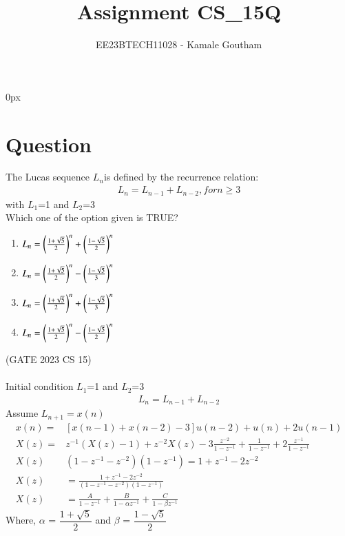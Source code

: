 \documentclass[journal,12pt,twocolumn]{IEEEtran}
\theoremstyle{remark}
\begin{document}
\parindent 0px

\title{Assignment CS\_15Q}
\author{EE23BTECH11028 - Kamale Goutham$^{}$%
}
\maketitle
\newpage
\bigskip
\section*{Question}
The Lucas sequence $L_{n}$is defined by the recurrence relation:\\
\begin{align*}
    L_{n}=L_{n-1}+L_{n-2}, for n\geq3
\end{align*}
with $L_{1}$=1 and $L_{2}$=3\\
Which one of the option given is TRUE?\\
\begin{enumerate}
    \item $L_{n}=\left(\frac{1+\sqrt{5}}{2}\right)^n+\left(\frac{1-\sqrt{5}}{2}\right)^n$
    \item $L_{n}=\left(\frac{1+\sqrt{5}}{2}\right)^n-\left(\frac{1-\sqrt{5}}{3}\right)^n$
    \item $L_{n}=\left(\frac{1+\sqrt{5}}{2}\right)^n+\left(\frac{1-\sqrt{5}}{3}\right)^n$
    \item $L_{n}=\left(\frac{1+\sqrt{5}}{2}\right)^n-\left(\frac{1-\sqrt{5}}{2}\right)^n$
\end{enumerate}
\hfill{(GATE 2023 CS 15)}\\
\solution\\
\fi
Initial condition $L_{1}$=1 and $L_{2}$=3
\begin{align}
 L_{n}=L_{n-1}+L_{n-2}
\end{align}
Assume $L_{n+1}=x(n)$\\
\begin{align}
 x(n)=&[x(n-1)+x(n-2)-3]u(n-2)+u(n)+2u(n-1)\\
 X(z)=&z^{-1}(X(z)-1)+z^{-2}X(z)-3\frac{z^{-2}}{1-z^{-1}}+\frac{1}{1-z^{-1}}+2\frac{z^{-1}}{1-z^{-1}}\\
 X(z)&(1-z^{-1}-z^{-2})(1-z^{-1})=1+z^{-1}-2z^{-2}\\
 X(z)&=\frac{1+z^{-1}-2z^{-2}}{(1-z^{-1}-z^{-2})(1-z^{-1})}\\
 X(z)&=\frac{A}{1-z^{-1}}+\frac{B}{1-\alpha z^{-1}}+\frac{C}{1-\beta z^{-1}}
 \end{align}
 Where, $\alpha$ = $\dfrac{1 +\sqrt{5}}{2}$ and $\beta$ = $\dfrac{1 -\sqrt{5}}{2}$ \\
 
\end{document}
